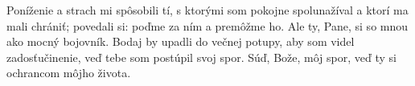 Poníženie a strach mi spôsobili tí, s ktorými som pokojne spolunažíval a ktorí ma mali chrániť; povedali si: 
poďme za ním a premôžme ho. Ale ty, Pane, si so mnou ako mocný bojovník.
\versseparator
Bodaj by upadli do večnej potupy, aby som videl zadosťučinenie, veď tebe som postúpil svoj spor.
\versseparator
Súď, Bože, môj spor, veď ty si ochrancom môjho života.